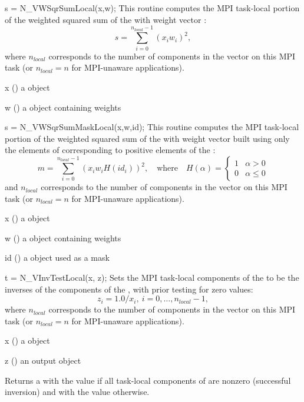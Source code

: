 {
  s = N\_VWSqrSumLocal(x,w);
}
{
  This routine computes the MPI task-local portion of the weighted
  squared sum of the   with weight vector :
  \begin{equation*}
    s = \sum_{i=0}^{n_{local}-1} (x_i w_i)^2,
  \end{equation*}
  where $n_{local}$ corresponds
  to the number of components in the vector on this MPI task (or
  $n_{local}=n$ for MPI-unaware applications).
}
{
  \begin{args}[x]
  \item[x] () a {\nvector} object
  \item[w] () a {\nvector} object containing weights
  \end{args}
}
{
}
{}

{
  s = N\_VWSqrSumMaskLocal(x,w,id);
}
{
  This routine computes the MPI task-local portion of the weighted
  squared sum of the   with weight
  vector  built using only the elements of  corresponding to
  positive elements of the  :
  \begin{equation*}
    m = \sum_{i=0}^{n_{local}-1} (x_i w_i H(id_i))^2, \quad \text{where} \quad H(\alpha)
  = \begin{cases} 1 & \alpha > 0 \\ 0 & \alpha \leq 0 \end{cases}
  \end{equation*}
  and
  $n_{local}$ corresponds to the number of components in the vector on
  this MPI task (or $n_{local}=n$ for MPI-unaware applications).
}
{
  \begin{args}[x]
  \item[x] () a {\nvector} object
  \item[w] () a {\nvector} object containing weights
  \item[id] () a {\nvector} object used as a mask
  \end{args}
}
{
}
{}

{
  t = N\_VInvTestLocal(x, z);
}
{
  Sets the MPI task-local components of the   to
  be the inverses of the components of the  , with
  prior testing for zero values:
  \begin{equation*}
  z_i = 1.0 /  x_i  , \: i=0,\ldots,n_{local}-1,
  \end{equation*}
  where $n_{local}$
  corresponds to the number of components in the vector on this MPI task
  (or $n_{local}=n$ for MPI-unaware applications).
}
{
  \begin{args}[x]
  \item[x] () a {\nvector} object
  \item[z] () an output {\nvector} object
  \end{args}
}
{
  Returns a  with the value  if all task-local
  components of  are nonzero (successful inversion) and with the
  value  otherwise.
}
{}

